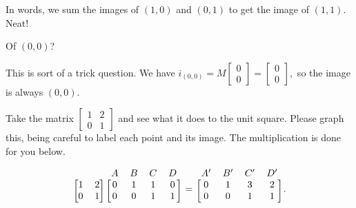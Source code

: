 \documentclass[../gatm_answers.tex]{subfiles}
\begin{document}
In words, we sum the images of $(1,0)$ and $(0,1)$ to get the image of $(1,1)$. Neat!

\begin{inner_problem}
\item Of $(0,0)$?
\end{inner_problem}

This is sort of a trick question. We have $i_{(0,0)} = M\begin{bmatrix} 0 \\ 0 \end{bmatrix} = \begin{bmatrix} 0 \\ 0 \end{bmatrix},$ so the image is always $(0,0)$.

\begin{outer_problem}
\item
\end{outer_problem}

\begin{inner_problem}[start=1]
\item Take the matrix $\left[\begin{smallmatrix}1 & 2 \\ 0 & 1\end{smallmatrix}\right]$ and see what it does to the unit square. Please graph this, being careful to label each point and its image. The multiplication is done for you below.

$$\begin{blockarray}{cccccc}
& & A & B & C & D \\
\begin{block}{[cc][cccc]}
1 & 2 & 0 & 1 & 1 & 0 \\
0 & 1 & 0 & 0 & 1 & 1 \\
\end{block}
\end{blockarray} =
\begin{blockarray}{cccc}
A' & B' & C' & D' \\
\begin{block}{[cccc]}
0 & 1 & 3 & 2 \\
0 & 0 & 1 & 1 \\
\end{block}
\end{blockarray}.$$
\end{inner_problem}
\end{document}
